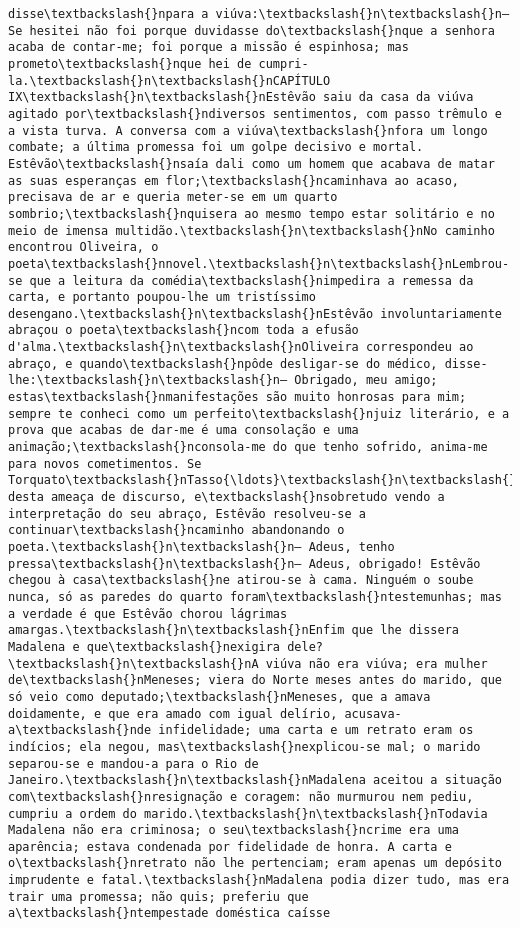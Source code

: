 \documentclass[11pt]{article}
\begin{document}
\begin{Verbatim}[commandchars=\\\{\}]
disse\textbackslash{}npara a viúva:\textbackslash{}n\textbackslash{}n— Se hesitei não foi porque duvidasse do\textbackslash{}nque a senhora acaba de contar-me; foi porque a missão é espinhosa; mas prometo\textbackslash{}nque hei de cumpri-la.\textbackslash{}n\textbackslash{}nCAPÍTULO IX\textbackslash{}n\textbackslash{}nEstêvão saiu da casa da viúva agitado por\textbackslash{}ndiversos sentimentos, com passo trêmulo e a vista turva. A conversa com a viúva\textbackslash{}nfora um longo combate; a última promessa foi um golpe decisivo e mortal. Estêvão\textbackslash{}nsaía dali como um homem que acabava de matar as suas esperanças em flor;\textbackslash{}ncaminhava ao acaso, precisava de ar e queria meter-se em um quarto sombrio;\textbackslash{}nquisera ao mesmo tempo estar solitário e no meio de imensa multidão.\textbackslash{}n\textbackslash{}nNo caminho encontrou Oliveira, o poeta\textbackslash{}nnovel.\textbackslash{}n\textbackslash{}nLembrou-se que a leitura da comédia\textbackslash{}nimpedira a remessa da carta, e portanto poupou-lhe um tristíssimo desengano.\textbackslash{}n\textbackslash{}nEstêvão involuntariamente abraçou o poeta\textbackslash{}ncom toda a efusão d'alma.\textbackslash{}n\textbackslash{}nOliveira correspondeu ao abraço, e quando\textbackslash{}npôde desligar-se do médico, disse-lhe:\textbackslash{}n\textbackslash{}n— Obrigado, meu amigo; estas\textbackslash{}nmanifestações são muito honrosas para mim; sempre te conheci como um perfeito\textbackslash{}njuiz literário, e a prova que acabas de dar-me é uma consolação e uma animação;\textbackslash{}nconsola-me do que tenho sofrido, anima-me para novos cometimentos. Se Torquato\textbackslash{}nTasso{\ldots}\textbackslash{}n\textbackslash{}nDiante desta ameaça de discurso, e\textbackslash{}nsobretudo vendo a interpretação do seu abraço, Estêvão resolveu-se a continuar\textbackslash{}ncaminho abandonando o poeta.\textbackslash{}n\textbackslash{}n— Adeus, tenho pressa\textbackslash{}n\textbackslash{}n— Adeus, obrigado! Estêvão chegou à casa\textbackslash{}ne atirou-se à cama. Ninguém o soube nunca, só as paredes do quarto foram\textbackslash{}ntestemunhas; mas a verdade é que Estêvão chorou lágrimas amargas.\textbackslash{}n\textbackslash{}nEnfim que lhe dissera Madalena e que\textbackslash{}nexigira dele?\textbackslash{}n\textbackslash{}nA viúva não era viúva; era mulher de\textbackslash{}nMeneses; viera do Norte meses antes do marido, que só veio como deputado;\textbackslash{}nMeneses, que a amava doidamente, e que era amado com igual delírio, acusava-a\textbackslash{}nde infidelidade; uma carta e um retrato eram os indícios; ela negou, mas\textbackslash{}nexplicou-se mal; o marido separou-se e mandou-a para o Rio de Janeiro.\textbackslash{}n\textbackslash{}nMadalena aceitou a situação com\textbackslash{}nresignação e coragem: não murmurou nem pediu, cumpriu a ordem do marido.\textbackslash{}n\textbackslash{}nTodavia Madalena não era criminosa; o seu\textbackslash{}ncrime era uma aparência; estava condenada por fidelidade de honra. A carta e o\textbackslash{}nretrato não lhe pertenciam; eram apenas um depósito imprudente e fatal.\textbackslash{}nMadalena podia dizer tudo, mas era trair uma promessa; não quis; preferiu que a\textbackslash{}ntempestade doméstica caísse 
\end{Verbatim}
\end{document}
